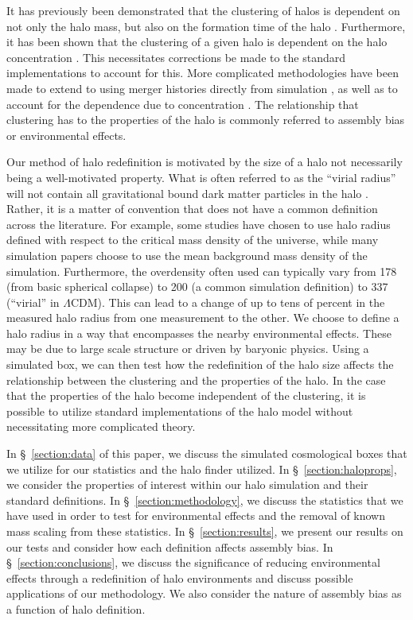 \documentclass[usenatbib,usegraphicx,letterpaper]{mn2e}
\begin{document}
It has previously been demonstrated that the clustering of halos is dependent on not only the halo mass, but also on the formation time of the halo \citep{sheth04, gao05, wechsler06, croton07, zentner07}. Furthermore, it has been shown that the clustering of a given halo is dependent on the halo concentration \citep{wechsler06}.  This necessitates corrections be made to the standard implementations to account for this. More complicated methodologies have been made to extend to using merger histories directly from simulation \citep{dvorkin11}, as well as to account for the dependence due to concentration \citep{gil11}. The relationship that clustering has to the properties of the halo is commonly referred to assembly bias or environmental effects.

Our method of halo redefinition is motivated by the size of a halo not necessarily being a well-motivated property. What is often referred to as the ``virial radius'' will not contain all gravitational bound dark matter particles in the halo \citep{kazan06}. Rather, it is a matter of convention that does not have a common definition across the literature. For example, some studies have chosen to use halo radius defined with respect to the critical mass density of the universe, while many simulation papers choose to use the mean background mass density of the simulation. Furthermore, the overdensity often used can typically vary from 178 (from basic spherical collapse) to 200 (a common simulation definition) to 337 (``virial'' in $\Lambda\mathrm{CDM}$). This can lead to a change of up to tens of percent in the measured halo radius from one measurement to the other. We choose to define a halo radius in a way that encompasses the nearby environmental effects. These may be due to large scale structure or driven by baryonic physics. Using a simulated box, we can then test how the redefinition of the halo size affects the relationship between the clustering and the properties of the halo. In the case that the properties of the halo become independent of the clustering, it is possible to utilize standard implementations of the halo model without necessitating more complicated theory.
 
In \S~\ref{section:data} of this paper, we discuss the simulated cosmological boxes that we utilize for our statistics and the halo finder utilized. In \S~\ref{section:haloprops}, we consider the properties of interest within our halo simulation and their standard definitions. In \S~\ref{section:methodology}, we discuss the statistics that we have used in order to test for environmental effects and the removal of known mass scaling from these statistics. In \S~\ref{section:results}, we present our results on our tests and consider how each definition affects assembly bias. In \S~\ref{section:conclusions}, we discuss the significance of reducing environmental effects through a redefinition of halo environments and discuss possible applications of our methodology. We also consider the nature of assembly bias as a function of halo definition.
\end{document}
